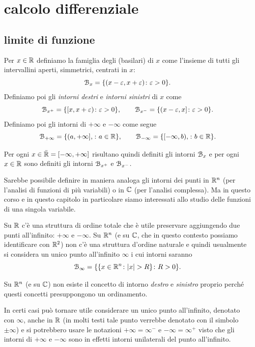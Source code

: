\chapter{calcolo differenziale}
\label{ch:differenziale}

\section{limite di funzione}

\begin{definition}[intorno]
Per $x\in \mathbb R$ definiamo la famiglia degli  (basilari) di $x$
come l'insieme di tutti gli intervallini aperti, simmetrici, centrati in $x$:
\[
  \mathcal B_x = {\left\{  (x-\varepsilon, x+\varepsilon) \colon \varepsilon>0 \right\}}.
\]
Definiamo poi gli \emph{intorni destri} e \emph{intorni sinistri}
di $x$ come
\[
  \mathcal B_{x^+} = {\left\{  [x, x+\varepsilon) \colon \varepsilon>0 \right\}},
  \qquad
  \mathcal B_{x^-} = {\left\{  (x-\varepsilon , x] \colon \varepsilon>0 \right\}}.
\]
Definiamo poi gli intorni di $+\infty$ e $-\infty$ come segue
\[
  \mathcal B_{+\infty} = {\left\{  (a,+\infty], \colon a \in \mathbb R  \right\}},\qquad
  \mathcal B_{-\infty} = {\left\{  [-\infty, b), \colon b\in \mathbb R \right\}}.
\]

Per ogni $x\in \bar {\mathbb R} = [-\infty, +\infty]$
risultano quindi definiti gli intorni $\mathcal B_x$ e per
ogni $x\in \mathbb R$ sono definiti gli intorni $\mathcal B_{x^+}$ e $\mathcal B_{x^-}$.
\end{definition}

\begin{remark}
Sarebbe possibile definire in maniera analoga gli intorni dei punti in $\mathbb R^n$
(per l'analisi di funzioni di più variabili)
o in $\mathbb C$ (per l'analisi complessa).
Ma in questo corso e in questo capitolo in particolare siamo interessati allo studio delle funzioni di una singola variabile.

Su $\mathbb R$ c'è una struttura di ordine totale che è utile preservare aggiungendo
due punti all'infinito: $+\infty$ e $-\infty$.
Su $\mathbb R^n$ (e su $\mathbb C$, che in questo contesto possiamo identificare con $\mathbb R^2$)
non c'è una struttura d'ordine naturale e quindi
usualmente si considera un unico punto all'infinito $\infty$ i cui intorni
saranno
\[
  \mathcal B_\infty = {\left\{ {\left\{ x \in \mathbb R^n\colon {\left|x\right|}>R \right\}}\colon R>0 \right\}}.
\]

Su $\mathbb R^n$ (e su $\mathbb C$) non esiste il concetto di intorno \emph{destro}
e \emph{sinistro} proprio perché questi concetti presuppongono un ordinamento.

In certi casi può tornare utile considerare un unico punto all'infinito,
denotato con $\infty$, anche in $\mathbb R$ (in molti testi tale punto verrebbe
denotato con il simbolo $\pm\infty$)
e si potrebbero usare le notazioni $+\infty = \infty^-$ e $-\infty = \infty^
+$ visto che gli intorni di $+\infty$ e $-\infty$ sono in effetti intorni
unilaterali del punto all'infinito.
\end{remark}

